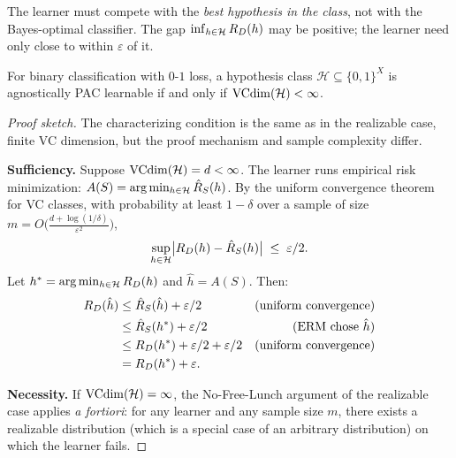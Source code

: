 The learner must compete with the \emph{best hypothesis in the class},
not with the Bayes-optimal classifier.  The gap
$\inf_{h \in \mathcal{H}} R_D(h)$ may be positive; the learner need
only close to within $\varepsilon$ of it.

\begin{thm}
\label{thm:agnostic-ft}
For binary classification with $0$-$1$ loss, a hypothesis class
$\mathcal{H} \subseteq \{0,1\}^X$ is agnostically PAC learnable if and only
if $\mathrm{VCdim}(\mathcal{H}) < \infty$.
\end{thm}

\begin{proof}[Proof sketch]
The characterizing condition is the same as in the realizable case, finite
VC dimension, but the proof mechanism and sample complexity differ.

\medskip\noindent
\textbf{Sufficiency.}  Suppose $\mathrm{VCdim}(\mathcal{H}) = d < \infty$.  The learner
runs empirical risk minimization: $A(S) = \arg\min_{h \in \mathcal{H}}
\hat{R}_S(h)$.  By the uniform convergence theorem for VC classes, with
probability at least $1 - \delta$ over a sample of size
$m = O\!\bigl(\frac{d + \log(1/\delta)}{\varepsilon^2}\bigr)$,
\[
  \sup_{h \in \mathcal{H}} \bigl|R_D(h) - \hat{R}_S(h)\bigr|
  \;\leq\; \varepsilon/2.
\]
Let $h^* = \arg\min_{h \in \mathcal{H}} R_D(h)$ and $\hat{h} = A(S)$.
Then:
\begin{align*}
  R_D(\hat{h})
  &\leq \hat{R}_S(\hat{h}) + \varepsilon/2
    &\text{(uniform convergence)}\\
  &\leq \hat{R}_S(h^*) + \varepsilon/2
    &\text{(ERM chose $\hat{h}$)}\\
  &\leq R_D(h^*) + \varepsilon/2 + \varepsilon/2
    &\text{(uniform convergence)}\\
  &= R_D(h^*) + \varepsilon.
\end{align*}

\medskip\noindent
\textbf{Necessity.}  If $\mathrm{VCdim}(\mathcal{H}) = \infty$, the No-Free-Lunch
argument of the realizable case applies \textit{a fortiori}: for any learner
and any sample size $m$, there exists a realizable distribution (which is
a special case of an arbitrary distribution) on which the learner fails.
\end{proof}

